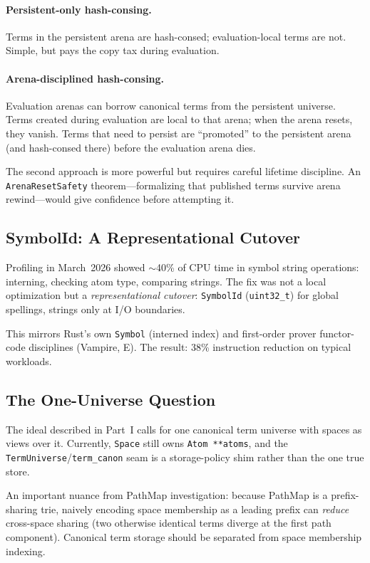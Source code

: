 \documentclass[11pt]{article}
\newcommand{\code}[1]{\texttt{#1}}
\newcommand{\PathMap}{\textup{PathMap}}
\begin{document}
\paragraph{Persistent-only hash-consing.}
Terms in the persistent arena are hash-consed; evaluation-local terms
are not.  Simple, but pays the copy tax during evaluation.

\paragraph{Arena-disciplined hash-consing.}
Evaluation arenas can borrow canonical terms from the persistent universe.
Terms created during evaluation are local to that arena; when the arena
resets, they vanish.  Terms that need to persist are ``promoted'' to the
persistent arena (and hash-consed there) before the evaluation arena dies.

The second approach is more powerful but requires careful lifetime
discipline.  An \code{ArenaResetSafety} theorem---formalizing that
published terms survive arena rewind---would give confidence before
attempting it.

\subsection{SymbolId: A Representational Cutover}

Profiling in March~2026 showed $\sim$40\% of CPU time in symbol string
operations: interning, checking atom type, comparing strings.  The fix
was not a local optimization but a \emph{representational cutover}:
\code{SymbolId} (\code{uint32\_t}) for global spellings, strings only
at I/O boundaries.

This mirrors Rust's own \code{Symbol} (interned index) and first-order
prover functor-code disciplines (Vampire, E).  The result: 38\% instruction
reduction on typical workloads.

\subsection{The One-Universe Question}

The ideal described in Part~I calls for one canonical term universe with
spaces as views over it.  Currently, \code{Space} still owns
\code{Atom **atoms}, and the \code{TermUniverse}/\code{term\_canon}
seam is a storage-policy shim rather than the one true store.

An important nuance from \PathMap{} investigation: because \PathMap{} is
a prefix-sharing trie, naively encoding space membership as a leading
prefix can \emph{reduce} cross-space sharing (two otherwise identical
terms diverge at the first path component).  Canonical term storage should
be separated from space membership indexing.
\end{document}
